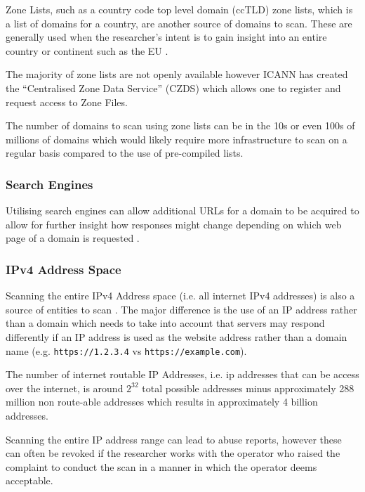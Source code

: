 \documentclass{mscreport}
\begin{document}
Zone Lists, such as a country code top level domain (ccTLD) zone lists, which is a list of domains for a country, are another source of domains to scan. These are generally used when the researcher's intent is to gain insight into an entire country or continent such as the EU \cite{Amann2017-co,Chen2016-dl,Van_Goethem2014-ao,Holz2020-ha}.

\vspace{0.3cm} \noindent
The majority of zone lists are not openly available however ICANN has created the ``Centralised Zone Data Service'' (CZDS) \cite{noauthor_undated-mm} which allows one to register and request access to Zone Files.

\vspace{0.3cm} \noindent
The number of domains to scan using zone lists can be in the 10s or even 100s of millions of domains which would likely require more infrastructure to scan on a regular basis compared to the use of pre-compiled lists.

\subsubsection{Search Engines}

Utilising search engines can allow additional URLs for a domain to be acquired to allow for further insight how responses might change depending on which web page of a domain is requested \cite{Chen2016-dl}.

\subsubsection{IPv4 Address Space}

Scanning the entire IPv4 Address space (i.e. all internet  IPv4 addresses) is also a source of entities to scan \cite{Kotzias2018-wd}. The major difference is the use of an IP address rather than a domain which needs to take into account that servers may respond differently if an IP address is used as the website address rather than a domain name (e.g. \texttt{https://1.2.3.4} vs \texttt{https://example.com}).

\vspace{0.3cm} \noindent
The number of internet routable IP Addresses, i.e. ip addresses that can be access over the internet, is around \(2^{32}\) total possible addresses minus approximately 288 million non route-able addresses which results in approximately 4 billion addresses.

\vspace{0.3cm} \noindent
Scanning the entire IP address range can lead to abuse reports, however these can often be revoked if the researcher works with the operator who raised the complaint to conduct the scan in a manner in which the operator deems acceptable.
\end{document}
